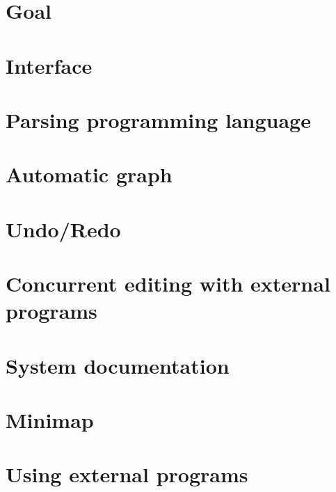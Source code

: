 \section{Goal}


\section{Interface}


\section{Parsing programming language}


\section{Automatic graph}


\section{Undo/Redo}


\section{Concurrent editing with external programs}


\section{System documentation}


\section{Minimap}


\section{Using external programs}

